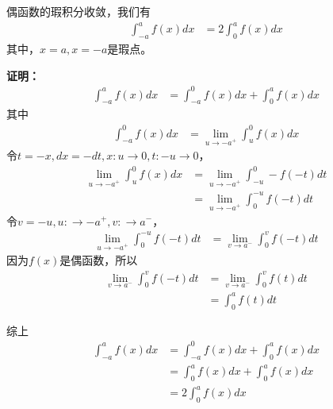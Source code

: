 \documentclass{article}
\begin{document}
\begin{zremark}
  偶函数的瑕积分收敛，我们有
  \begin{align*}
    \int_{-a}^a f(x) dx
     & = 2 \int_{0}^a f(x) dx
  \end{align*}
  其中，$x = a, x = -a$是瑕点。
\end{zremark}

\textbf{证明：}
\begin{align*}
  \int_{-a}^a f(x) dx
   & = \int_{-a}^0 f(x) dx + \int_{0}^a f(x) dx
\end{align*}
其中
\begin{align*}
  \int_{-a}^0 f(x) dx
   & = \lim\limits_{u \to -a^+} \int_{u}^{0} f(x) dx
\end{align*}
令$t = -x, dx = -dt, x: u \to 0, t: -u \to 0$，
\begin{align*}
  \lim\limits_{u \to -a^+} \int_{u}^{0} f(x) dx
   & = \lim\limits_{u \to -a^+} \int_{- u}^{0} - f(-t) dt \\
   & = \lim\limits_{u \to -a^+} \int_{0}^{-u} f(-t) dt
\end{align*}
令$v = -u, u: \to -a^+, v: \to a^-$，
\begin{align*}
  \lim\limits_{u \to -a^+} \int_{0}^{-u} f(-t) dt
   & = \lim\limits_{v \to a^-} \int_{0}^{v} f(-t) dt
\end{align*}
因为$f(x)$是偶函数，所以
\begin{align*}
  \lim\limits_{v \to a^-} \int_{0}^{v} f(-t) dt
   & = \lim\limits_{v \to a^-} \int_{0}^{v} f(t) dt \\
   & = \int_{0}^{a} f(t) dt
\end{align*}

综上
\begin{align*}
  \int_{-a}^a f(x) dx
   & = \int_{-a}^0 f(x) dx + \int_{0}^a f(x) dx \\
   & = \int_{0}^a f(x) dx + \int_{0}^a f(x) dx  \\
   & = 2 \int_{0}^a f(x) dx
\end{align*}
\end{document}

